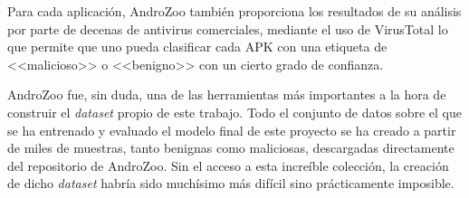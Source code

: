 Para cada aplicación, AndroZoo también proporciona los resultados de su análisis por parte de decenas de antivirus comerciales, mediante el uso de VirusTotal lo que permite que uno pueda clasificar cada APK con una etiqueta de <<malicioso>> o <<benigno>> con un cierto grado de confianza.

AndroZoo fue, sin duda, una de las herramientas más importantes a la hora de construir el \textit{dataset} propio de este trabajo. Todo el conjunto de datos sobre el que se ha entrenado y evaluado el modelo final de este proyecto se ha creado a partir de miles de muestras, tanto benignas como maliciosas, descargadas directamente del repositorio de AndroZoo. Sin el acceso a esta increíble colección, la creación de dicho \textit{dataset} habría sido muchísimo más difícil sino prácticamente imposible.
